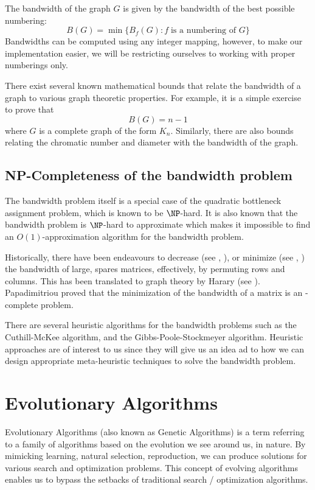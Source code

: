 \documentclass[conference,compsoc]{IEEEtran}
\begin{document}
The bandwidth of the graph $G$ is given by the bandwidth of the best possible numbering:
\begin{equation}
  B(G) = \min \{B_f(G): f \; \text{is a numbering of }  G\}
\end{equation}
Bandwidths can be computed using any integer mapping, however, to make our implementation 
easier, we will be restricting ourselves to working with proper numberings only.

There exist several known mathematical bounds that relate the bandwidth of a graph 
to various graph theoretic properties. For example, it is a simple exercise to prove that 
\[B(G) = n - 1\] where $G$ is a complete graph of the form $K_n$. Similarly, there are also bounds 
relating the chromatic number and diameter with the bandwidth of the graph.  \cite{ccdg1982}

\subsection{NP-Completeness of the bandwidth problem}

The bandwidth problem itself is a special case of the quadratic bottleneck assignment problem, which is known to be 
$\NP$-hard. It is also known that the bandwidth problem is $\NP$-hard to approximate which makes it impossible to find 
an $O(1)$-approximation algorithm for the bandwidth problem. 

Historically, there have been endeavours to decrease (see \cite{10.1145/800195.805928}, \cite{sparse}), or minimize 
(see \cite{chen}, \cite{chen2}) 
the bandwidth of large, spares matrices, effectively, by permuting rows and columns. 
This has been translated to graph theory by Harary (see \cite{1973141}). 
Papadimitriou proved that the minimization of the bandwidth of a matrix is an 
\NP-complete problem. \cite{papadimitriou_1976}

There are several heuristic algorithms for the bandwidth problems such as the Cuthill-McKee algorithm, and the 
Gibbs-Poole-Stockmeyer algorithm.  Heuristic approaches are of interest to us since they will give us an 
idea ad to how we can design appropriate meta-heuristic techniques to solve the bandwidth problem. 

\section{Evolutionary Algorithms}
Evolutionary Algorithms (also known as Genetic Algorithms) is a term referring to a 
family of algorithms based on the evolution we see around us, in nature. By mimicking learning, 
natural selection, reproduction, we can produce solutions for various search and optimization problems. 
This concept of evolving algorithms enables us to bypass the setbacks of traditional search / optimization algorithms.
\end{document}
